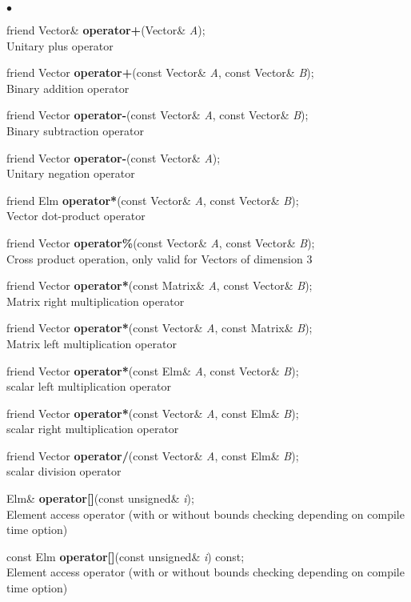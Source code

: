 \documentclass{article}
\newcommand{\Func}[1]{\textbf{#1}}
\newcommand{\var}[1]{\textit{#1}}
\newenvironment{LIST}{\begin{list}{$\bullet$}{%
      \setlength{\leftmargin}{2\leftmargin}%
      \setlength{\itemindent}{-1cm}}}%
  {\end{list}}
\begin{document}
\begin{LIST}
 \item friend Vector\& \Func{operator+}(Vector\& \var{A});\\
  Unitary plus operator
 \item friend Vector \Func{operator+}(const Vector\& \var{A},
  const Vector\& \var{B});\\
  Binary addition operator
 \item friend Vector \Func{operator-}(const Vector\& \var{A},
  const Vector\& \var{B});\\
  Binary subtraction operator
 \item friend Vector \Func{operator-}(const Vector\& \var{A});\\
  Unitary negation operator
 \item friend Elm \Func{operator*}(const Vector\& \var{A},
  const Vector\& \var{B});\\
  Vector dot-product operator
 \item friend Vector \Func{operator\%}(const Vector\& \var{A},
  const Vector\& \var{B});\\
  Cross product operation, only valid for Vectors of dimension 3
 \item friend Vector \Func{operator*}(const Matrix\& \var{A},
  const Vector\& \var{B});\\
  Matrix right multiplication operator
 \item friend Vector \Func{operator*}(const Vector\& \var{A},
  const Matrix\& \var{B});\\
  Matrix left multiplication operator
 \item friend Vector \Func{operator*}(const Elm\& \var{A},
  const Vector\& \var{B});\\
  scalar left multiplication operator
 \item friend Vector \Func{operator*}(const Vector\& \var{A},
  const Elm\& \var{B});\\
  scalar right multiplication operator
 \item friend Vector \Func{operator/}(const Vector\& \var{A},
  const Elm\& \var{B});\\
  scalar division operator \\[.5cm]
  
 \item Elm\& \Func{operator[]}(const unsigned\& \var{i});\\
  Element access operator (with or without bounds checking depending on compile
  time option)
 \item const Elm \Func{operator[]}(const unsigned\& \var{i}) const;\\
  Element access operator (with or without bounds checking depending on compile
  time option)\\[.5cm]


\end{LIST}
\end{document}
